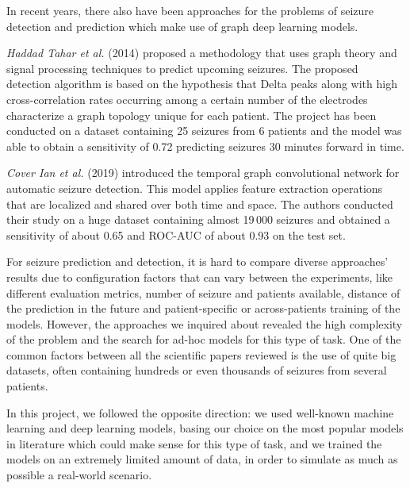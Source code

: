 In recent years, there also have been approaches for the problems of seizure detection and prediction which make use of graph deep learning models.

\textit{Haddad Tahar et al.} (2014) \cite{IEEE:graphtheory} proposed a methodology that uses graph theory and signal processing techniques to predict upcoming seizures. The proposed detection algorithm is based on the hypothesis that Delta peaks along with high cross-correlation rates occurring among a certain number of the electrodes characterize a graph topology unique for each patient. The project has been conducted on a dataset containing 25 seizures from 6 patients and the model was able to obtain a sensitivity of 0.72 predicting seizures 30 minutes forward in time.

\textit{Cover Ian et al.} (2019) \cite{arXiv:graphseizuredet} introduced the temporal graph convolutional network for automatic seizure detection. This model applies feature extraction operations that are localized and shared over both time and space. The authors conducted their study on a huge dataset containing almost 19\,000 seizures and obtained a sensitivity of about 0.65 and ROC-AUC of about 0.93 on the test set.

For seizure prediction and detection, it is hard to compare diverse approaches' results due to configuration factors that can vary between the experiments, like different evaluation metrics, number of seizure and patients available, distance of the prediction in the future and patient-specific or across-patients training of the models. However, the approaches we inquired about revealed the high complexity of the problem and the search for ad-hoc models for this type of task. One of the common factors between all the scientific papers reviewed is the use of quite big datasets, often containing hundreds or even thousands of seizures from several patients.

In this project, we followed the opposite direction: we used well-known machine learning and deep learning models, basing our choice on the most popular models in literature which could make sense for this type of task, and we trained the models on an extremely limited amount of data, in order to simulate as much as possible a real-world scenario.
